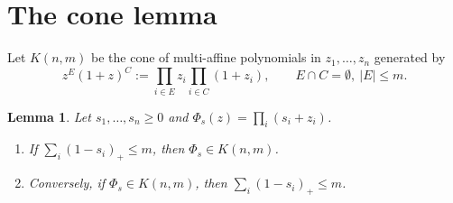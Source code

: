 \documentclass[11pt]{article}
\newtheorem{lemma}[theorem]{Lemma}
\theoremstyle{remark}
\begin{document}
\section{The cone lemma}
Let $K(n,m)$ be the cone of multi-affine polynomials in $z_1,\dots,z_n$ generated by
\[
z^E(1+z)^C:=\prod_{i\in E}z_i\prod_{i\in C}(1+z_i),\qquad E\cap C=\emptyset,\ |E|\le m .
\]
\begin{lemma}\label{lem:cone}
Let $s_1,\dots,s_n\ge0$ and $\Phi_s(z)=\prod_i(s_i+z_i)$.
\begin{enumerate}
\item[(a)] If $\sum_i(1-s_i)_+\le m$, then $\Phi_s\in K(n,m)$.
\item[(b)] Conversely, if $\Phi_s\in K(n,m)$, then $\sum_i(1-s_i)_+\le m$.
\end{enumerate}
\end{lemma}
\end{document}
